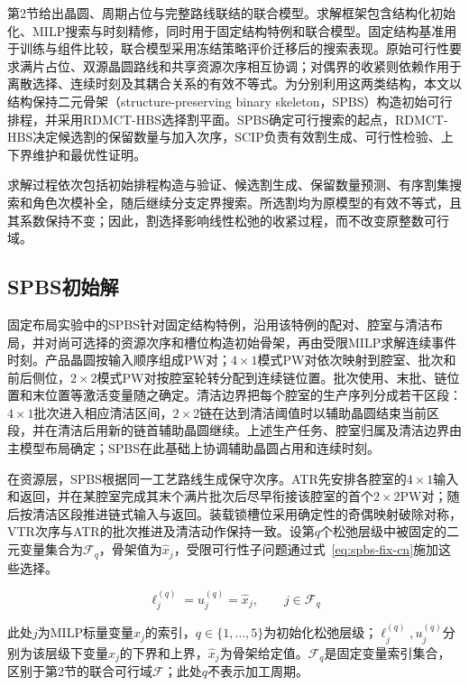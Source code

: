 \documentclass[final,5p,times,twocolumn]{elsarticle}
\newcommand{\method}{RDMCT-HBS}
\begin{document}
第2节给出晶圆、周期占位与完整路线联结的联合模型。求解框架包含结构化初始化、MILP搜索与时刻精修，同时用于固定结构特例和联合模型。固定结构基准用于训练与组件比较，联合模型采用冻结策略评价迁移后的搜索表现。原始可行性要求满片占位、双源晶圆路线和共享资源次序相互协调；对偶界的收紧则依赖作用于离散选择、连续时刻及其耦合关系的有效不等式。为分别利用这两类结构，本文以结构保持二元骨架（structure-preserving binary skeleton，SPBS）构造初始可行排程，并采用\method{}选择割平面。SPBS确定可行搜索的起点，\method{}决定候选割的保留数量与加入次序，SCIP负责有效割生成、可行性检验、上下界维护和最优性证明\citep{achterberg2009scip,bestuzheva2023scip}。

求解过程依次包括初始排程构造与验证、候选割生成、保留数量预测、有序割集搜索和角色次模补全，随后继续分支定界搜索。所选割均为原模型的有效不等式，且其系数保持不变；因此，割选择影响线性松弛的收紧过程，而不改变原整数可行域。

\subsection{SPBS初始解}

固定布局实验中的SPBS针对固定结构特例，沿用该特例的配对、腔室与清洁布局，并对尚可选择的资源次序和槽位构造初始骨架，再由受限MILP求解连续事件时刻。产品晶圆按输入顺序组成PW对；$4\times1$模式PW对依次映射到腔室、批次和前后侧位，$2\times2$模式PW对按腔室轮转分配到连续链位置。批次使用、末批、链位置和末位置等激活变量随之确定。清洁边界把每个腔室的生产序列分成若干区段：$4\times1$批次进入相应清洁区间，$2\times2$链在达到清洁阈值时以辅助晶圆结束当前区段，并在清洁后用新的链首辅助晶圆继续。上述生产任务、腔室归属及清洁边界由主模型布局确定；SPBS在此基础上协调辅助晶圆占用和连续时刻。

在资源层，SPBS根据同一工艺路线生成保守次序。ATR先安排各腔室的$4\times1$输入和返回，并在某腔室完成其末个满片批次后尽早衔接该腔室的首个$2\times2$PW对；随后按清洁区段推进链式输入与返回。装载锁槽位采用确定性的奇偶映射破除对称，VTR次序与ATR的批次推进及清洁动作保持一致。设第$q$个松弛层级中被固定的二元变量集合为$\mathcal F_q$，骨架值为$\widehat x_j$，受限可行性子问题通过式~\eqref{eq:spbs-fix-cn}施加这些选择。

\begin{equation}
\ell_j^{(q)}=u_j^{(q)}=\widehat x_j,\qquad j\in\mathcal F_q
\label{eq:spbs-fix-cn}
\end{equation}

此处$j$为MILP标量变量$x_j$的索引，$q\in\{1,\ldots,5\}$为初始化松弛层级；$\ell_j^{(q)},u_j^{(q)}$分别为该层级下变量$x_j$的下界和上界，$\widehat x_j$为骨架给定值。$\mathcal F_q$是固定变量索引集合，区别于第2节的联合可行域$\mathcal F$；此处$q$不表示加工周期。
\end{document}
